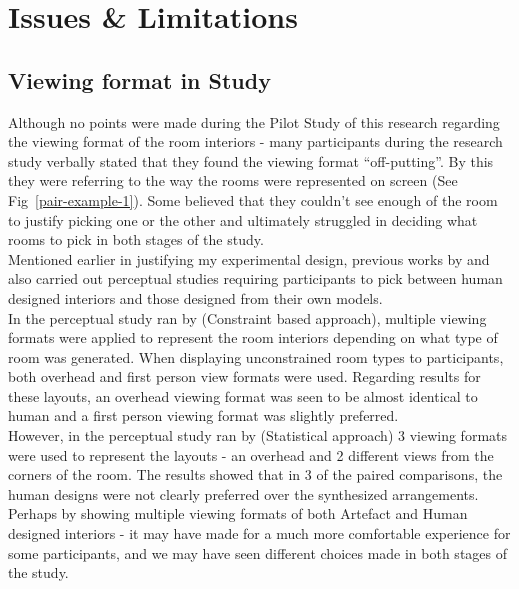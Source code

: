\section{Issues \& Limitations}\label{issues}
\subsection{Viewing format in Study}
Although no points were made during the Pilot Study of this research regarding the viewing format of the room interiors - many participants during the research study verbally stated that they found the viewing format ``off-putting''. By this they were referring to the way the rooms were represented on screen (See Fig~\ref{pair-example-1}). Some believed that they couldn't see enough of the room to justify picking one or the other and ultimately struggled in deciding what rooms to pick in both stages of the study.
\\
Mentioned earlier in justifying my experimental design, previous works by  \cite{constrained-layouts} and  \cite{make-it-home} also carried out perceptual studies requiring participants to pick between human designed interiors and those designed from their own models.
\\
In the perceptual study ran by  \cite{constrained-layouts} (Constraint based approach), multiple viewing formats were applied to represent the room interiors depending on what type of room was generated. When displaying unconstrained room types to participants, both overhead and first person view formats were used. Regarding results for these layouts, an overhead viewing format was seen to be almost identical to human and a first person viewing format was slightly preferred.
\\
However, in the perceptual study ran by  \cite{make-it-home} (Statistical approach) 3 viewing formats were used to represent the layouts - an overhead and 2 different views from the corners of the room. The results showed that in 3 of the paired comparisons, the human designs were not clearly preferred over the synthesized arrangements.
\\
Perhaps by showing multiple viewing formats of both Artefact and Human designed interiors - it may have made for a much more comfortable experience for some participants, and we may have seen different choices made in both stages of the study.

